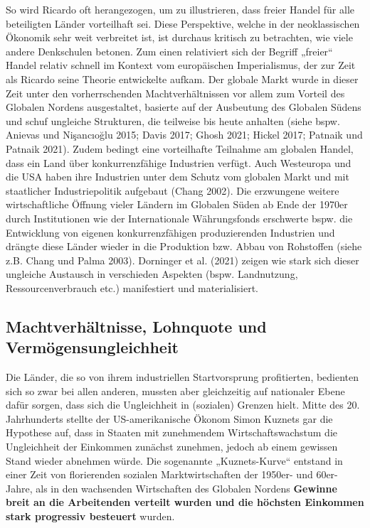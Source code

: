 \documentclass[
  nswissgerman,
  a4paper,
  DIV=11,
  numbers=noendperiod,
  oneside,
  openany]{scrreprt}
\begin{document}
So wird Ricardo oft herangezogen, um zu illustrieren, dass freier Handel
für alle beteiligten Länder vorteilhaft sei. Diese Perspektive, welche
in der neoklassischen Ökonomik sehr weit verbreitet ist, ist durchaus
kritisch zu betrachten, wie viele andere Denkschulen betonen. Zum einen
relativiert sich der Begriff „freier`` Handel relativ schnell im Kontext
vom europäischen Imperialismus, der zur Zeit als Ricardo seine Theorie
entwickelte aufkam. Der globale Markt wurde in dieser Zeit unter den
vorherrschenden Machtverhältnissen vor allem zum Vorteil des Globalen
Nordens ausgestaltet, basierte auf der Ausbeutung des Globalen Südens
und schuf ungleiche Strukturen, die teilweise bis heute anhalten (siehe
bspw. Anievas und Nişancıoğlu 2015; Davis 2017; Ghosh 2021; Hickel 2017;
Patnaik und Patnaik 2021). Zudem bedingt eine vorteilhafte Teilnahme am
globalen Handel, dass ein Land über konkurrenzfähige Industrien verfügt.
Auch Westeuropa und die USA haben ihre Industrien unter dem Schutz vom
globalen Markt und mit staatlicher Industriepolitik aufgebaut (Chang
2002). Die erzwungene weitere wirtschaftliche Öffnung vieler Ländern im
Globalen Süden ab Ende der 1970er durch Institutionen wie der
Internationale Währungsfonds erschwerte bspw. die Entwicklung von
eigenen konkurrenzfähigen produzierenden Industrien und drängte diese
Länder wieder in die Produktion bzw. Abbau von Rohstoffen (siehe z.B.
Chang und Palma 2003). Dorninger et al. (2021) zeigen wie stark sich
dieser ungleiche Austausch in verschieden Aspekten (bspw. Landnutzung,
Ressourcenverbrauch etc.) manifestiert und materialisiert.

\subsection{Machtverhältnisse, Lohnquote und
Vermögensungleichheit}\label{machtverhuxe4ltnisse-lohnquote-und-vermuxf6gensungleichheit}

Die Länder, die so von ihrem industriellen Startvorsprung profitierten,
bedienten sich so zwar bei allen anderen, mussten aber gleichzeitig auf
nationaler Ebene dafür sorgen, dass sich die Ungleichheit in (sozialen)
Grenzen hielt. Mitte des 20. Jahrhunderts stellte der US-amerikanische
Ökonom Simon Kuznets gar die Hypothese auf, dass in Staaten mit
zunehmendem Wirtschaftswachstum die Ungleichheit der Einkommen zunächst
zunehmen, jedoch ab einem gewissen Stand wieder abnehmen würde. Die
sogenannte „Kuznets-Kurve`` entstand in einer Zeit von florierenden
sozialen Marktwirtschaften der 1950er- und 60er-Jahre, als in den
wachsenden Wirtschaften des Globalen Nordens \textbf{Gewinne breit an
die Arbeitenden verteilt wurden und die höchsten Einkommen stark
progressiv besteuert} wurden.
\end{document}
